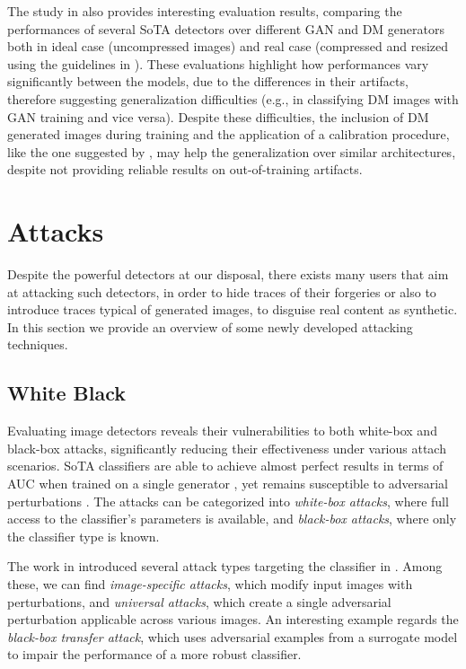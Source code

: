 \documentclass[conference]{IEEEtran} %
\begin{document}
        The study in \cite{corvi2023detection} also provides interesting evaluation results, comparing the performances of several SoTA detectors over different GAN and DM generators both in ideal case (uncompressed images) and real case (compressed and resized using the guidelines in \cite{vipcuplink}). These evaluations highlight how performances vary significantly between the models, due to the differences in their artifacts, therefore suggesting generalization difficulties (e.g., in classifying DM images with GAN training and vice versa). Despite these difficulties, the inclusion of DM generated images during training and the application of a calibration procedure, like the one suggested by \cite{Platt1999probabilistic}, may help the generalization over similar architectures, despite not providing reliable results on out-of-training artifacts.

\section{Attacks}
    Despite the powerful detectors at our disposal, there exists many users that aim at attacking such detectors, in order to hide traces of their forgeries or also to introduce traces typical of generated images, to disguise real content as synthetic. In this section we provide an overview of some newly developed attacking techniques.

    \subsection{White Black}
        Evaluating image detectors reveals their vulnerabilities to both white-box and black-box attacks, significantly reducing their effectiveness under various attach scenarios. SoTA classifiers are able to achieve almost perfect results in terms of AUC when trained on a single generator \cite{Wang_2020_CVPR}, yet remains susceptible to adversarial perturbations \cite{de2024exploring}. The attacks can be categorized into \textit{white-box attacks}, where full access to the classifier's parameters is available, and \textit{black-box attacks}, where only the classifier type is known.
        
        The work in \cite{de2024exploring} introduced several attack types targeting the classifier in \cite{Wang_2020_CVPR}. Among these, we can find \textit{image-specific attacks}, which modify input images with perturbations, and \textit{universal attacks}, which create a single adversarial perturbation applicable across various images. An interesting example regards the \textit{black-box transfer attack}, which uses adversarial examples from a surrogate model to impair the performance of a more robust classifier.
\end{document}
